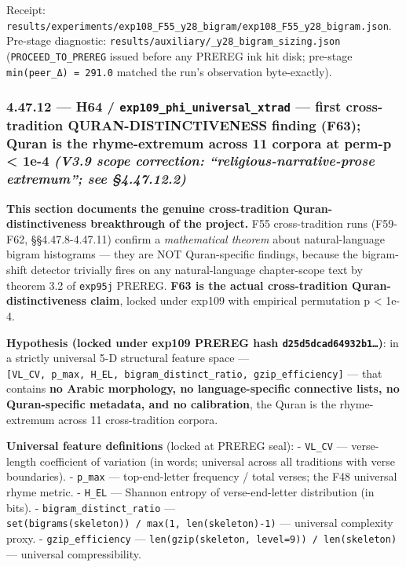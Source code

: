 \documentclass[
]{article}
\begin{document}
Receipt:
\texttt{results/experiments/exp108\_F55\_y28\_bigram/exp108\_F55\_y28\_bigram.json}.
Pre-stage diagnostic:
\texttt{results/auxiliary/\_y28\_bigram\_sizing.json}
(\texttt{PROCEED\_TO\_PREREG} issued before any PREREG ink hit disk;
pre-stage \texttt{min(peer\_Δ)\ =\ 291.0} matched the run's observation
byte-exactly).

\subsubsection{\texorpdfstring{4.47.12 --- H64 /
\texttt{exp109\_phi\_universal\_xtrad} --- first cross-tradition
QURAN-DISTINCTIVENESS finding (F63); Quran is the rhyme-extremum across
11 corpora at perm-p \textless{} 1e-4 \emph{(V3.9 scope correction:
``religious-narrative-prose extremum''; see
§4.47.12.2)}}{4.47.12 --- H64 / exp109\_phi\_universal\_xtrad --- first cross-tradition QURAN-DISTINCTIVENESS finding (F63); Quran is the rhyme-extremum across 11 corpora at perm-p \textless{} 1e-4 (V3.9 scope correction: ``religious-narrative-prose extremum''; see §4.47.12.2)}}\label{h64-exp109_phi_universal_xtrad-first-cross-tradition-quran-distinctiveness-finding-f63-quran-is-the-rhyme-extremum-across-11-corpora-at-perm-p-1e-4-v3.9-scope-correction-religious-narrative-prose-extremum-see-4.47.12.2}

\textbf{This section documents the genuine cross-tradition
Quran-distinctiveness breakthrough of the project.} F55 cross-tradition
runs (F59-F62, §§4.47.8-4.47.11) confirm a \emph{mathematical theorem}
about natural-language bigram histograms --- they are NOT Quran-specific
findings, because the bigram-shift detector trivially fires on any
natural-language chapter-scope text by theorem 3.2 of \texttt{exp95j}
PREREG. \textbf{F63 is the actual cross-tradition Quran-distinctiveness
claim}, locked under exp109 with empirical permutation p \textless{}
1e-4.

\textbf{Hypothesis (locked under exp109 PREREG hash
\texttt{d25d5dcad64932b1…})}: in a strictly universal 5-D structural
feature space ---
\texttt{{[}VL\_CV,\ p\_max,\ H\_EL,\ bigram\_distinct\_ratio,\ gzip\_efficiency{]}}
--- that contains \textbf{no Arabic morphology, no language-specific
connective lists, no Quran-specific metadata, and no calibration}, the
Quran is the rhyme-extremum across 11 cross-tradition corpora.

\textbf{Universal feature definitions} (locked at PREREG seal): -
\texttt{VL\_CV} --- verse-length coefficient of variation (in words;
universal across all traditions with verse boundaries). -
\texttt{p\_max} --- top-end-letter frequency / total verses; the F48
universal rhyme metric. - \texttt{H\_EL} --- Shannon entropy of
verse-end-letter distribution (in bits). -
\texttt{bigram\_distinct\_ratio} ---
\texttt{\textbar{}set(bigrams(skeleton))\textbar{}\ /\ max(1,\ len(skeleton)-1)}
--- universal complexity proxy. - \texttt{gzip\_efficiency} ---
\texttt{len(gzip(skeleton,\ level=9))\ /\ len(skeleton)} --- universal
compressibility.
\end{document}
